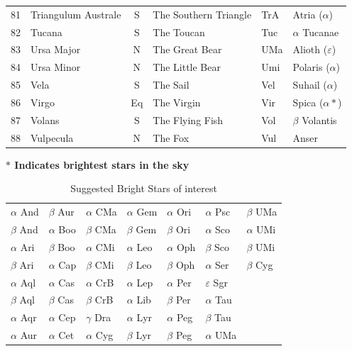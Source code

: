 \documentclass[a4paper,12pt]{extarticle}
\begin{document}
\begin{table}[H]
\begin{tabular}{llclll}
81                         & Triangulum Australe                  & S                               & The Southern Triangle                  & TrA                         & Atria ($\alpha$)  \\
82 & Tucana     & S  & The Toucan      & Tuc & $\alpha$ Tucanae       \\
83 & Ursa Major & N  & The Great Bear  & UMa & Alioth ($\varepsilon$) \\
84 & Ursa Minor & N  & The Little Bear & Umi & Polaris ($\alpha$)     \\
85 & Vela       & S  & The Sail        & Vel & Suhail ($\alpha$)      \\
86 & Virgo      & Eq & The Virgin      & Vir & Spica ($\alpha \ast$)  \\
87 & Volans     & S  & The Flying Fish & Vol & $\beta$ Volantis       \\
88 & Vulpecula  & N  & The Fox         & Vul & Anser 
\end{tabular}
\end{table}

\textbf{$\ast$ Indicates brightest stars in the sky}

\begin{table}[H]
\centering
\begin{tabular}{lllllll}
$\alpha$ And                & $\beta$ Aur  & $\alpha$ CMa  & $\alpha$ Gem & $\alpha$ Ori & $\alpha$ Psc      & $\beta$ UMa   \\
$\beta$ And                 & $\alpha$ Boo & $\beta$ CMa   & $\beta$ Gem  & $\beta$ Ori  & $\alpha$ Sco      & $\alpha$ UMi \\
$\alpha$ Ari                & $\beta$ Boo  & $\alpha$ CMi  & $\alpha$ Leo & $\alpha$ Oph & $\beta$ Sco       & $\beta$ UMi  \\
$\beta$ Ari                 & $\alpha$ Cap & $\beta$ CMi   & $\beta$ Leo  & $\beta$ Oph  & $\alpha$ Ser      & $\beta$ Cyg  \\
$\alpha$ Aql                & $\alpha$ Cas & $\alpha$ CrB  & $\alpha$ Lep & $\alpha$ Per & $\varepsilon$ Sgr &              \\
$\beta$ Aql                 & $\beta$ Cas  & $\beta$ CrB   & $\alpha$ Lib & $\beta$ Per  & $\alpha$ Tau      &              \\
$\alpha$ Aqr                & $\alpha$ Cep & $\gamma$  Dra & $\alpha$ Lyr & $\alpha$ Peg & $\beta$ Tau       &              \\
$\alpha$ Aur & $\alpha$ Cet & $\alpha$ Cyg  & $\beta$ Lyr  & $\beta$ Peg  & $\alpha$ UMa      &             
\end{tabular}
\caption{Suggested Bright Stars of interest}
\end{table}
\end{document}
